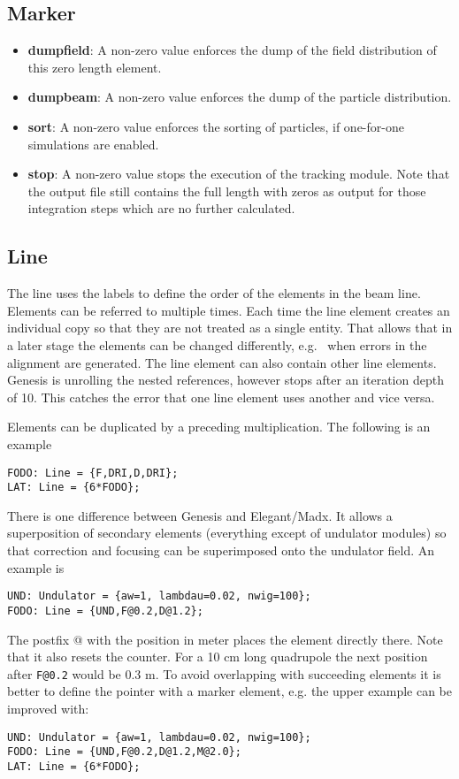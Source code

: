 \documentclass[12pt]{book}
\begin{document}
\subsection {\sf Marker}
\begin{itemize}
\item {\bf dumpfield}: A non-zero value enforces the dump of the field distribution of this zero length element.
\item {\bf dumpbeam}: A non-zero value enforces the dump of the particle distribution.
\item {\bf sort}: A non-zero value enforces the sorting of particles, if one-for-one simulations are enabled.
\item {\bf stop}: A non-zero value stops the execution of the tracking module. Note that the output file still contains the full length with zeros as output for those integration steps which are no further calculated.
\end{itemize}

\subsection {\sf Line}

The line uses the labels to define the order of the elements in the beam line. Elements can be referred to multiple times. Each time the line element creates an individual copy so that they are not treated as a single entity. That allows that in a later stage the elements can be changed differently, e.g.~ when errors in the alignment are generated. The line element can also contain other line elements. Genesis is unrolling the nested references, however stops after an iteration depth of 10. This catches the error that one line element uses another and vice versa.

Elements can be duplicated by a preceding multiplication. The following is an example

\begin{verbatim}
FODO: Line = {F,DRI,D,DRI};
LAT: Line = {6*FODO};
\end{verbatim}

There is one difference between Genesis and Elegant/Madx. It allows a superposition of secondary elements (everything except of undulator modules) so that correction and focusing can be superimposed onto the undulator field. An example is

\begin{verbatim}
UND: Undulator = {aw=1, lambdau=0.02, nwig=100};
FODO: Line = {UND,F@0.2,D@1.2};
\end{verbatim}
The postfix @ with the position in meter places the element directly there. Note that it also resets the counter. For a 10 cm long quadrupole the next position after {\tt F@0.2} would be 0.3 m. To avoid overlapping with succeeding elements it is better to define the pointer with a marker element, e.g. the upper example can be improved with:
\begin{verbatim}
UND: Undulator = {aw=1, lambdau=0.02, nwig=100};
FODO: Line = {UND,F@0.2,D@1.2,M@2.0};
LAT: Line = {6*FODO};
\end{verbatim}
 
\end{document}
